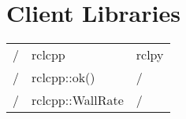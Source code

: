 \part{Client Libraries}



  \begin{tabularx}{\linewidth}{| l | l | l |}
    / & rclcpp & rclpy \\
    / & rclcpp::ok() & / \\
    / & rclcpp::WallRate & / \\
  \end{tabularx}




  